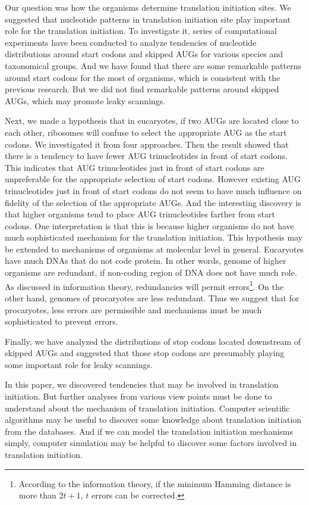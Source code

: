 

Our question was how the organisms determine translation initiation
sites. We suggested that nucleotide patterns in translation initiation 
site play
important role for the translation initiation.
To investigate it, series of computational experiments have
been conducted to analyze tendencies of nucleotide distributions
around start codons and skipped AUGs for various species and
taxonomical groups. And we have found that there are some remarkable
patterns around start codons for the most of organisms, which is
consistent with the previous research. But we did not find remarkable
patterns around skipped AUGs, which may promote leaky scannings.

Next, we made a hypothesis that in eucaryotes, if two AUGs are located close
to each other, 
ribosomes will confuse to select the appropriate AUG as the start
codons. We investigated it from four approaches. Then the result
showed that there is a tendency to have fewer AUG trinucleotides in
front of start codons. This indicates that AUG trinucleotides just in 
front of start codons are unpreferable for the appropriate selection
of start codons. 
However existing AUG trinucleotides just in front of
start codons do not seem to have much influence on fidelity of the selection of
the appropriate AUGs. 
And the interesting discovery is that higher organisms tend to place
AUG trinucleotides farther from start codons. One interpretation is
that this is because higher organisms do not have much sophisticated
mechanism for the translation initiation. This hypothesis may be
extended to mechanisms of organisms at molecular level in
general. Eucaryotes have much DNAs 
that do not code protein. In other words, genome of higher
organisms are redundant, if non-coding region of DNA does not have
much role. As discussed in information theory, redundancies will
permit errors\footnote{According to the information theory, if the
minimum Hamming distance is more than 
\(2t + 1\), \(t\) errors can be corrected.}. On the other
hand, genomes of procaryotes are less 
redundant. Thus we suggest that for procaryotes, less errors are
permissible and mechanisms must be much sophisticated to prevent errors.

Finally, we have analyzed the distributions of stop codons located
downstream of skipped AUGs and suggested that those stop codons are
presumably playing some important role for leaky scannings.

In this paper, we discovered tendencies that may be involved in
translation initiation. But further analyses from various view points
must be done to understand about the mechanism of translation
initiation. Computer scientific algorithms may be useful to
discover some knowledge about translation initiation from the databases.
And if we can model the translation initiation mechanisms simply,
computer simulation may be helpful to discover some factors 
involved in translation initiation.


